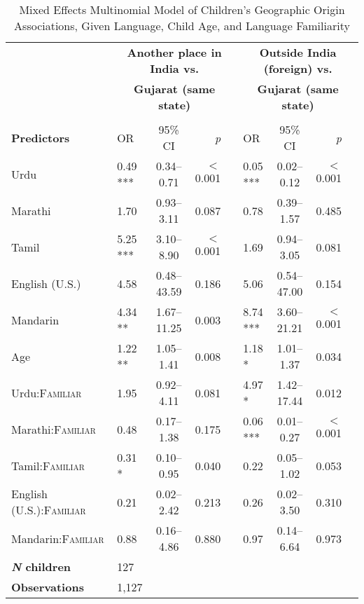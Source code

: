 \begin{table*}[t]
\small
\caption{Mixed Effects Multinomial Model of Children's Geographic Origin Associations, Given Language, Child Age, and Language Familiarity}\label{tab:geoidmod}
    \centering
    \vspace{5pt}
\begin{threeparttable}
\begin{tabular}{llcrclcrc}
 \toprule
& \multicolumn{4}{c}{\textbf{Another place in India vs.}} & \multicolumn{4}{c}{\textbf{Outside India (foreign) vs.}}\\
 & \multicolumn{4}{c}{\textbf{Gujarat (same state)\tnote{a}}} & \multicolumn{4}{c}{\textbf{Gujarat (same state)\tnote{a}}}\\
\cline{2-4} \cline{6-8}\\[-.75em]
\textbf{Predictors}\tnote{b} & {OR} & {95\% CI} & \textit{p} & & {OR} & {95\% CI} & \textit{p} & \\ 
\midrule
Urdu & 0.49 *** & 0.34--0.71 & $<$0.001 &  & 0.05 *** & 0.02--0.12 & $<$0.001 \\
Marathi & 1.70 & 0.93--3.11 & 0.087 &  & 0.78 & 0.39--1.57 & 0.485 \\
Tamil & 5.25 *** & 3.10--8.90 & $<$0.001 &  & 1.69 & 0.94--3.05 & 0.081 \\
English (U.S.) & 4.58 & 0.48--43.59 & 0.186 &  & 5.06 & 0.54--47.00 & 0.154 \\
Mandarin & 4.34 ** & 1.67--11.25 & 0.003 &  & 8.74 *** & 3.60--21.21 & $<$0.001 \\
Age\tnote{c} & 1.22 ** & 1.05--1.41 & 0.008 &  & 1.18 * & 1.01--1.37 & 0.034 \\
Urdu:\textsc{Familiar} & 1.95 & 0.92--4.11 & 0.081 &  & 4.97 * & 1.42--17.44 & 0.012 \\
Marathi:\textsc{Familiar} & 0.48 & 0.17--1.38 & 0.175 &  & 0.06 *** & 0.01--0.27 & $<$0.001 \\
Tamil:\textsc{Familiar} & 0.31 * & 0.10--0.95 & 0.040 &  & 0.22 & 0.05--1.02 & 0.053 \\
English (U.S.):\textsc{Familiar} & 0.21 & 0.02--2.42 & 0.213 &  & 0.26 & 0.02--3.50 & 0.310 \\
Mandarin:\textsc{Familiar} & 0.88 & 0.16--4.86 & 0.880 &  & 0.97 & 0.14--6.64 & 0.973 \\
\midrule
\bfseries{\textit{N} children}\tnote{d} & 127 & & & & & & \\ 
\textbf{Observations}\tnote{e} & 1,127 & & & & & & & \\ 

\end{tabular}
\end{threeparttable}
\end{table*}

